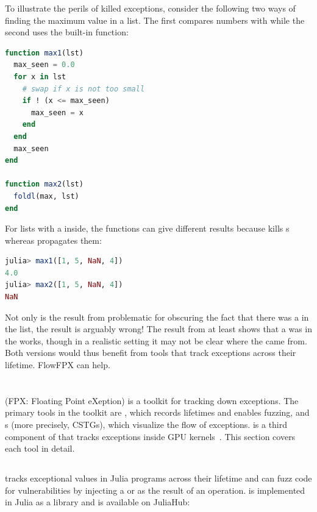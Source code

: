 \documentclass{juliacon}
\begin{document}
To illustrate the perils of killed exceptions, consider the following two ways
of finding the maximum value in a list.
The first compares numbers with \code{<=}
while the second uses the built-in  function:

\begin{lstlisting}[language = Julia]
function max1(lst)
  max_seen = 0.0
  for x in lst
    # swap if x is not too small
    if ! (x <= max_seen)
      max_seen = x
    end
  end
  max_seen
end

function max2(lst)
  foldl(max, lst)
end
\end{lstlisting}

For lists with a \Nan{} inside, the functions can give different
results because \code{<=} kills \Nan{}s whereas 
propagates them:

\begin{lstlisting}[language = Julia]
julia> max1([1, 5, NaN, 4]) 
4.0
julia> max2([1, 5, NaN, 4]) 
NaN
\end{lstlisting}

Not only is the result from  problematic for obscuring the fact that there was a \NaN{} in the list, the result is arguably wrong!
The result from  at least shows that a \Nan{} was in the works, though in a realistic setting it may not be clear where the \Nan{} came from.
Both versions would thus benefit from tools that track exceptions across their lifetime.
FlowFPX can help.

\section{\FlowFPX{}}
\label{s:flowfpx}

\FlowFPX{} (FPX: Floating Point eXeption) is a toolkit for tracking down \fp{} exceptions.
The primary tools in the \FlowFPX{} toolkit are \TF{}, which records lifetimes
and enables fuzzing, and \CSTG{}s (more precisely, CSTGs), which visualize
the flow of exceptions.
\GPUFPX{} is a third component of \FlowFPX{} that tracks \fp{} exceptions inside GPU kernels~\cite{llsflg-hpdc-2023}.
This section covers each tool in detail.

\subsection{\TF{}}
\label{s:floattracker}

\TF{} tracks exceptional values in Julia programs across
their \genpropkill{} lifetime and can fuzz code for vulnerabilities by
injecting a \Nan{} or \Inf{} as the result of an operation. \TF{} is
implemented in Julia as a library and is available on JuliaHub:
\end{document}
